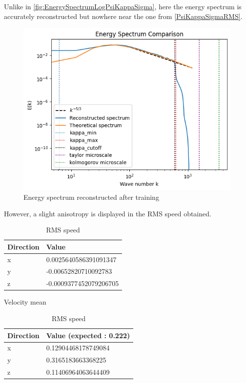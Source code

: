 \documentclass[a4paper,12pt]{article}
\theoremstyle{definition}
\begin{document}
Unlike in \ref{fig:EnergySpectrumLogPsiKappaSigma}, here the energy spectrum is accurately reconstructed but nowhere near the one from \ref{PsiKappaSigmaRMS}.

\begin{figure}[H]
    \centering
    \includegraphics[width=0.7\linewidth]{illustrations/EnergySpectrumTrained.png}
    \caption{Energy spectrum reconstructed after training}
    \label{EnergySpectrumAngles}
\end{figure}

However, a slight anisotropy is displayed in the RMS speed obtained.
\begin{table}[h]
\centering
\begin{minipage}{0.45\textwidth}
\centering
\begin{tabular}{ll}
\toprule
\textbf{Direction} & \textbf{Value} \\
\midrule
x & 0.0025640586391091347 \\
y & -0.00652820710092783 \\
z & -0.0009377452079206705 \\
\bottomrule
\end{tabular}
\caption{Velocity mean}
\label{AnglesMean}
\end{minipage}
\hfill
\begin{minipage}{0.45\textwidth}
\centering
\begin{tabular}{ll}
\toprule
\textbf{Direction} & \textbf{Value (expected : 0.222)} \\
\midrule
x & 0.12904468178749084 \\
y & 0.3165183663368225 \\
z & 0.11406964063644409 \\
\bottomrule
\end{tabular}
\caption{RMS speed}
\label{AnglesRMS}
\end{minipage}
\end{table}
\end{document}
